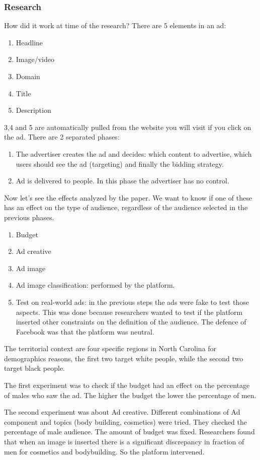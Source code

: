 \subsubsection{Research}
How did it work at time of the research? There are 5 elements in an ad:
\begin{enumerate}
    \item Headline
    \item Image/video
    \item Domain 
    \item Title
    \item Description
\end{enumerate}
3,4 and 5 are automatically pulled from the website you will visit if you click on the ad. There are 2 separated phases:
\begin{enumerate}
    \item The advertiser creates the ad and decides: which content to advertise, which users should see the ad (targeting) and finally the bidding strategy.
    \item Ad is delivered to people. In this phase the advertiser has no control.
\end{enumerate} 
Now let's see the effects analyzed by the paper. We want to know if one of these has an effect on the type of audience, regardless of the audience selected in the previous phases.
\begin{enumerate}
    \item Budget
    \item Ad creative
    \item Ad image
    \item Ad image classification: performed by the platform.
    \item Test on real-world ads: in the previous steps the ads were fake to test those aspects. This was done because researchers wanted to test if the platform inserted other constraints on the definition of the audience. The defence of Facebook was that the platform was neutral.
\end{enumerate}
The territorial context are four specific regions in North Carolina for demographics reasons, the first two target white people, while the second two target black people.

The first experiment was to check if the budget had an effect on the percentage of males who saw the ad. The higher the budget the lower the percentage of men.

The second experiment was about Ad creative. Different combinations of Ad component and topics (body building, cosmetics) were tried. They checked the percentage of male audience. The amount of budget was fixed. Researchers found that when an image is inserted there is a significant discrepancy in fraction of men for cosmetics and bodybuilding. So the platform intervened.

